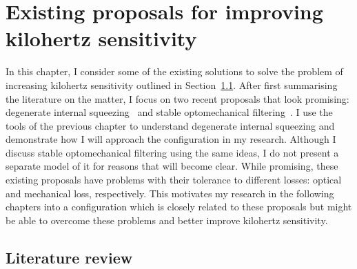\chapter{Existing proposals for improving kilohertz sensitivity} %
\label{chp:proposals}

In this chapter, I consider some of the existing solutions to solve the problem of increasing kilohertz sensitivity outlined in Section~\ref{}. After first summarising the literature on the matter, I focus on two recent proposals that look promising: degenerate internal squeezing~\cite{} and stable optomechanical filtering~\cite{}. I use the tools of the previous chapter to understand degenerate internal squeezing and demonstrate how I will approach the configuration in my research. Although I discuss stable optomechanical filtering using the same ideas, I do not present a separate model of it for reasons that will become clear. 
While promising, these existing proposals have problems with their tolerance to different losses: optical and mechanical loss, respectively. This motivates my research in the following chapters into a configuration which is closely related to these proposals but might be able to overcome these problems and better improve kilohertz sensitivity.


\section{Literature review}


